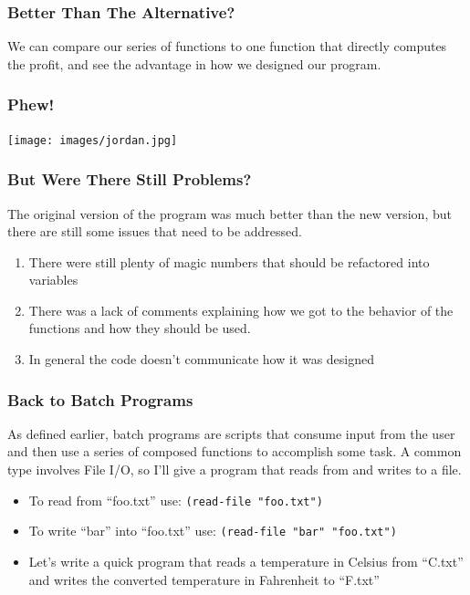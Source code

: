 \documentclass{beamer}
\begin{document}
\begin{frame}
  \frametitle{Better Than The Alternative?}
  We can compare our series of functions to one function that directly computes
  the profit, and see the advantage in how we designed our program.
  \pause
  \badProgram
\end{frame}

\begin{frame}
  \frametitle{Phew!}
  \begin{center}
    \texttt{[image: images/jordan.jpg]}
  \end{center}
\end{frame}

\begin{frame}
  \frametitle{But Were There Still Problems?}
  The original version of the program was much better than the new version, but
  there are still some issues that need to be addressed.
  \begin{enumerate}
  \item<2-> There were still plenty of magic numbers that should be refactored into variables
  \item<3-> There was a lack of comments explaining how we got to the behavior of
    the functions and how they should be used.
  \item<4-> In general the code doesn't communicate how it was designed
  \end{enumerate}
\end{frame}

\begin{frame}
  \frametitle{Back to Batch Programs}
  As defined earlier, batch programs are scripts that consume input from the
  user and then use a series of composed functions to accomplish some task.
  A common type involves File I/O, so I'll give a program that reads from and
  writes to a file.
  \begin{itemize}
  \item<2-> To read from ``foo.txt'' use: \texttt{(read-file "foo.txt")}
  \item<3-> To write ``bar'' into ``foo.txt'' use: \texttt{(read-file "bar" "foo.txt")}
  \item<4-> Let's write a quick program that reads a temperature in Celsius
    from ``C.txt'' and writes the converted temperature in Fahrenheit to ``F.txt''
  \end{itemize}  
\end{frame}

\end{document}
